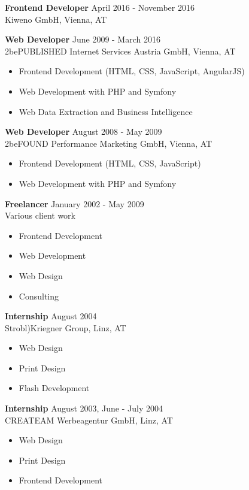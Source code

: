 \documentclass[margin]{res}
\begin{document}
\begin{resume}
\textbf{Frontend Developer} \hfill April 2016 - November 2016 \\
  Kiweno GmbH, Vienna, AT

\textbf{Web Developer} \hfill June 2009 - March 2016 \\
  2bePUBLISHED Internet Services Austria GmbH, Vienna, AT
  \begin{itemize}  \itemsep -2pt %
    \item Frontend Development (HTML, CSS, JavaScript, AngularJS)
    \item Web Development with PHP and Symfony
    \item Web Data Extraction and Business Intelligence
  \end{itemize}

\textbf{Web Developer} \hfill August 2008 - May 2009 \\
  2beFOUND Performance Marketing GmbH, Vienna, AT
  \begin{itemize}  \itemsep -2pt
    \item Frontend Development (HTML, CSS, JavaScript)
    \item Web Development with PHP and Symfony
  \end{itemize}

\textbf{Freelancer} \hfill January 2002 - May 2009 \\
  Various client work
  \begin{itemize}  \itemsep -2pt
    \item Frontend Development
    \item Web Development
    \item Web Design
    \item Consulting
  \end{itemize}

\textbf{Internship} \hfill August 2004 \\
  Strobl)Kriegner Group, Linz, AT
  \begin{itemize}  \itemsep -2pt
    \item Web Design
    \item Print Design
    \item Flash Development
    \end{itemize}

\textbf{Internship} \hfill August 2003, June - July 2004 \\
  CREATEAM Werbeagentur GmbH, Linz, AT
  \begin{itemize}  \itemsep -2pt
    \item Web Design
    \item Print Design
    \item Frontend Development
  \end{itemize}


\end{resume}
\end{document}
